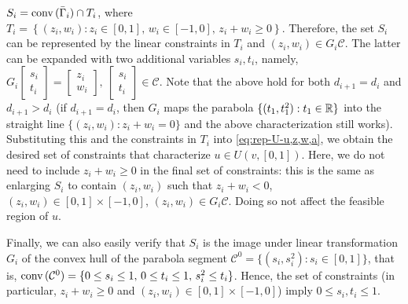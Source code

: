 	$S_i = \textnormal{conv}\,(\bar{\Gamma}_i) \cap T_i$,
	where 
	$T_i = \left\{ (z_i, w_i): z_i \in [0,1],\, w_i \in [-1,0],\, z_i + w_i \geq 0 \right\}$.
	Therefore, the set $S_i$ can be represented by the linear constraints in $T_i$ and $ (z_i, w_i)\in G_i \mathcal{C}$. 
	The latter can be expanded with two additional variables $s_i, t_i$, namely, 
	$G_i \begin{bmatrix}
		s_i \\ t_i
	\end{bmatrix} = \begin{bmatrix}
		z_i \\ w_i
	\end{bmatrix},\ \begin{bmatrix}
		s_i \\ t_i
	\end{bmatrix} \in \mathcal{C}$.
	Note that the above hold for both $d_{i+1} = d_i$ and $d_{i+1} > d_i$ (if $d_{i+1} = d_i$, then $G_i$ maps the parabola $\{(t_1, t_1^2): t_1 \in \mathbb{R} \}$ into the straight line $\{ (z_i, w_i): z_i + w_i = 0 \}$ and the above characterization still works).
	Substituting this and the constraints in $T_i$ into \eqref{eq:rep-U-u,z,w,a}, we obtain the desired set of constraints that characterize $u\in U(v, [0,1])$.
	Here, we do not need to include $z_i + w_i \geq 0$ in the final set of constraints: this is the same as enlarging $S_i$ to contain $(z_i, w_i)$ such that $z_i + w_i < 0$, $(z_i, w_i)\in [0,1]\times [-1, 0]$, $(z_i, w_i) \in G_i \mathcal{C}$. Doing so not affect the feasible region of $u$.

	Finally, we can also easily verify that $S_i$ is the image under linear transformation $G_i$ of the convex hull of the parabola segment $\mathcal{C}^0 = \{ (s_i, s_i^2): s_i \in [0,1] \}$, that is, 
	$\textnormal{conv}\,(\mathcal{C}^0) = \{ 0\leq s_i \leq 1,\, 0 \leq t_i \leq 1,\, s_i^2 \leq t_i \}$.
	Hence, the set of constraints (in particular, $z_i + w_i \geq 0$ and $(z_i,w_i)\in [0,1] \times [-1,0]$) imply
	$0\leq s_i, t_i \leq 1$.

